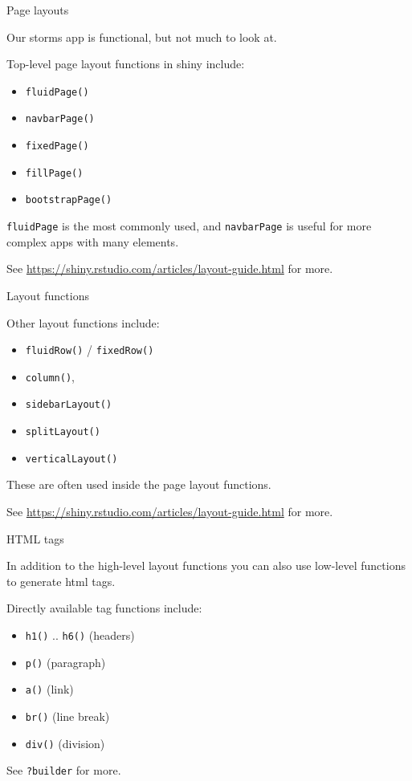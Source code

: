\documentclass[
  12pt,
  ignorenonframetext,
]{beamer}
\providecommand{\tightlist}{%
  \setlength{\itemsep}{0pt}\setlength{\parskip}{0pt}}
\begin{document}
\begin{frame}[fragile]{Page layouts}
\protect\hypertarget{page-layouts}{}

Our storms app is functional, but not much to look at.

Top-level page layout functions in shiny include:

\begin{itemize}
\tightlist
\item
  \texttt{fluidPage()}
\item
  \texttt{navbarPage()}
\item
  \texttt{fixedPage()}
\item
  \texttt{fillPage()}
\item
  \texttt{bootstrapPage()}
\end{itemize}

\texttt{fluidPage} is the most commonly used, and \texttt{navbarPage} is
useful for more complex apps with many elements.

See \url{https://shiny.rstudio.com/articles/layout-guide.html} for more.

\end{frame}

\begin{frame}[fragile]{Layout functions}
\protect\hypertarget{layout-functions}{}

Other layout functions include:

\begin{itemize}
\tightlist
\item
  \texttt{fluidRow()} / \texttt{fixedRow()}
\item
  \texttt{column()},
\item
  \texttt{sidebarLayout()}
\item
  \texttt{splitLayout()}
\item
  \texttt{verticalLayout()}
\end{itemize}

These are often used inside the page layout functions.

See \url{https://shiny.rstudio.com/articles/layout-guide.html} for more.

\end{frame}

\begin{frame}[fragile]{HTML tags}
\protect\hypertarget{html-tags}{}

In addition to the high-level layout functions you can also use
low-level functions to generate html tags.

Directly available tag functions include:

\begin{itemize}
\tightlist
\item
  \texttt{h1()} .. \texttt{h6()} (headers)
\item
  \texttt{p()} (paragraph)
\item
  \texttt{a()} (link)
\item
  \texttt{br()} (line break)
\item
  \texttt{div()} (division)
\end{itemize}

See \texttt{?builder} for more.

\end{frame}
\end{document}
